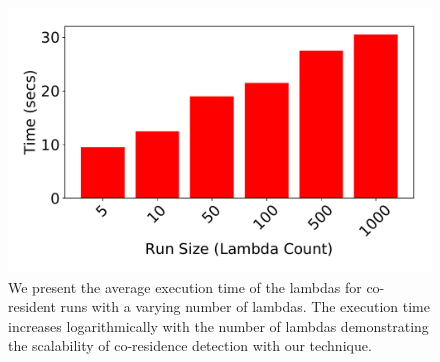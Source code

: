 \begin{figure}[!t]
  \includegraphics[width=.99\linewidth]{fig/runtimes.pdf}
  \caption{We present the average execution time of the lambdas for co-resident
  runs with a varying number of lambdas. The execution time increases
  logarithmically with the number of lambdas demonstrating the scalability of
  co-residence detection with our technique.
\label{fig:runtimes}}
\end{figure}



